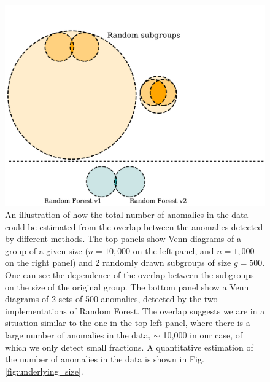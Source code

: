 \documentclass[fleqn,usenatbib]{mnras}
\begin{document}
{\begin{figure}

\includegraphics[width=\columnwidth]{all_v4.pdf}


\caption{An illustration of how the total number of anomalies in the data could be estimated from the overlap between the anomalies detected by different methods. The top  panels show  Venn diagrams of a group of a given size ($n=10,000$ on the left panel, and $n=1,000$ on the right panel) and 2 randomly drawn  subgroups of size $g = 500$. One can see the dependence of the overlap between the subgroups on the size of the original group. The bottom  panel show a Venn diagrams of  2  sets of 500  anomalies, detected by the two implementations of Random Forest. The overlap suggests we are in a situation similar to the one in the top left panel, where there is a large number of anomalies in the data, $\sim$ 10,000 in our case, of which we only detect small fractions.  A  quantitative estimation of the number of anomalies in the data is shown in Fig. \ref{fig:underlying_size}.} \label{fig:venns}
\end{figure}



}
\end{document}
